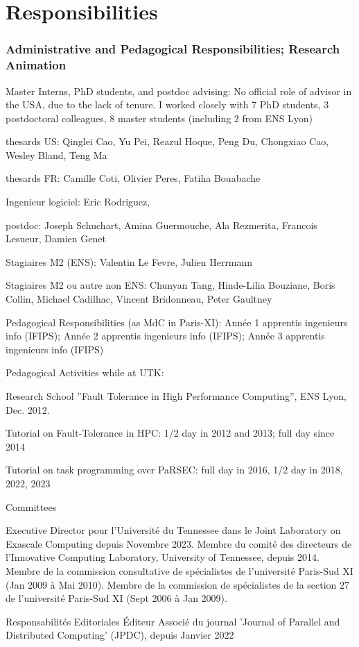 \section{Responsibilities}

\begin{frame}
  \frametitle{Administrative and Pedagogical Responsibilities; Research Animation}

  Master Interns, PhD students, and postdoc advising:
  No official role of advisor in the USA, due to the lack of tenure. I worked closely with
  7 PhD students, 3 postdoctoral colleagues, 8 master students (including 2 from ENS Lyon)
  
  thesards US: Qinglei Cao, Yu Pei, Reazul Hoque, Peng Du, Chongxiao Cao, Wesley Bland, Teng Ma

  thesards FR: Camille Coti, Olivier Peres, Fatiha Bouabache

  Ingenieur logiciel: Eric Rodriguez, 
  
  postdoc: Joseph Schuchart, Amina Guermouche, Ala Rezmerita, Francois Lesueur, Damien Genet

  Stagiaires M2 (ENS): Valentin Le Fevre, Julien Herrmann

  Stagiaires M2 ou autre non ENS: Chunyan Tang, Hinde-Lilia Bouziane, Boris Collin, Michael Cadilhac, Vincent Bridonneau, Peter Gaultney

  Pedagogical Responsibilities (as MdC in Paris-XI): Ann\'ee 1 apprentis ingenieurs info (IFIPS); Ann\'ee 2 apprentis ingenieurs info (IFIPS); Ann\'ee 3 apprentis ingenieurs info (IFIPS)

  Pedagogical Activities while at UTK:
  
  Research School ”Fault Tolerance in High Performance Computing”, ENS Lyon, Dec. 2012.
  
  Tutorial on Fault-Tolerance in HPC: 1/2 day in 2012 and 2013; full day since 2014

  Tutorial on task programming over PaRSEC: full day in 2016, 1/2 day in 2018, 2022, 2023

  Committees
  
  Executive Director pour l’Université du Tennessee dans le Joint Laboratory on Exascale Computing depuis
Novembre 2023.
 Membre du comité des directeurs de l’Innovative Computing Laboratory, University of Tennessee, depuis 2014.
 Membre de la commission consultative de spécialistes de l’université Paris-Sud XI (Jan 2009 à Mai 2010).
 Membre de la commission de spécialistes de la section 27 de l’université Paris-Sud XI (Sept 2006 à Jan 2009).

 Responsabilités Editoriales Éditeur Associé du journal ’Journal of Parallel and Distributed Computing’ (JPDC), depuis
 Janvier 2022
 
\end{frame}
